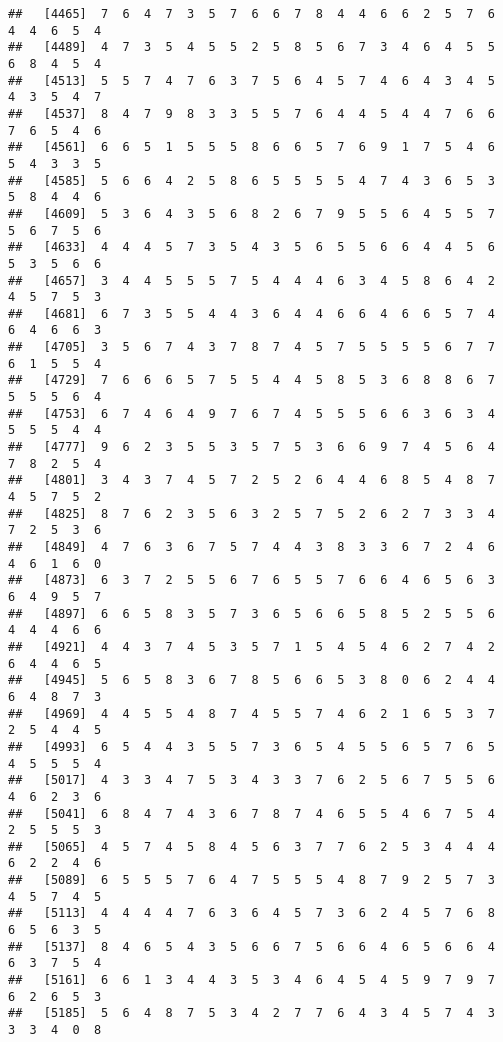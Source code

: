 \documentclass[
]{book}
\begin{document}
\begin{verbatim}
##   [4465]  7  6  4  7  3  5  7  6  6  7  8  4  4  6  6  2  5  7  6  4  4  6  5  4
##   [4489]  4  7  3  5  4  5  5  2  5  8  5  6  7  3  4  6  4  5  5  6  8  4  5  4
##   [4513]  5  5  7  4  7  6  3  7  5  6  4  5  7  4  6  4  3  4  5  4  3  5  4  7
##   [4537]  8  4  7  9  8  3  3  5  5  7  6  4  4  5  4  4  7  6  6  7  6  5  4  6
##   [4561]  6  6  5  1  5  5  5  8  6  6  5  7  6  9  1  7  5  4  6  5  4  3  3  5
##   [4585]  5  6  6  4  2  5  8  6  5  5  5  5  4  7  4  3  6  5  3  5  8  4  4  6
##   [4609]  5  3  6  4  3  5  6  8  2  6  7  9  5  5  6  4  5  5  7  5  6  7  5  6
##   [4633]  4  4  4  5  7  3  5  4  3  5  6  5  5  6  6  4  4  5  6  5  3  5  6  6
##   [4657]  3  4  4  5  5  5  7  5  4  4  4  6  3  4  5  8  6  4  2  4  5  7  5  3
##   [4681]  6  7  3  5  5  4  4  3  6  4  4  6  6  4  6  6  5  7  4  6  4  6  6  3
##   [4705]  3  5  6  7  4  3  7  8  7  4  5  7  5  5  5  5  6  7  7  6  1  5  5  4
##   [4729]  7  6  6  6  5  7  5  5  4  4  5  8  5  3  6  8  8  6  7  5  5  5  6  4
##   [4753]  6  7  4  6  4  9  7  6  7  4  5  5  5  6  6  3  6  3  4  5  5  5  4  4
##   [4777]  9  6  2  3  5  5  3  5  7  5  3  6  6  9  7  4  5  6  4  7  8  2  5  4
##   [4801]  3  4  3  7  4  5  7  2  5  2  6  4  4  6  8  5  4  8  7  4  5  7  5  2
##   [4825]  8  7  6  2  3  5  6  3  2  5  7  5  2  6  2  7  3  3  4  7  2  5  3  6
##   [4849]  4  7  6  3  6  7  5  7  4  4  3  8  3  3  6  7  2  4  6  4  6  1  6  0
##   [4873]  6  3  7  2  5  5  6  7  6  5  5  7  6  6  4  6  5  6  3  6  4  9  5  7
##   [4897]  6  6  5  8  3  5  7  3  6  5  6  6  5  8  5  2  5  5  6  4  4  4  6  6
##   [4921]  4  4  3  7  4  5  3  5  7  1  5  4  5  4  6  2  7  4  2  6  4  4  6  5
##   [4945]  5  6  5  8  3  6  7  8  5  6  6  5  3  8  0  6  2  4  4  6  4  8  7  3
##   [4969]  4  4  5  5  4  8  7  4  5  5  7  4  6  2  1  6  5  3  7  2  5  4  4  5
##   [4993]  6  5  4  4  3  5  5  7  3  6  5  4  5  5  6  5  7  6  5  4  5  5  5  4
##   [5017]  4  3  3  4  7  5  3  4  3  3  7  6  2  5  6  7  5  5  6  4  6  2  3  6
##   [5041]  6  8  4  7  4  3  6  7  8  7  4  6  5  5  4  6  7  5  4  2  5  5  5  3
##   [5065]  4  5  7  4  5  8  4  5  6  3  7  7  6  2  5  3  4  4  4  6  2  2  4  6
##   [5089]  6  5  5  5  7  6  4  7  5  5  5  4  8  7  9  2  5  7  3  4  5  7  4  5
##   [5113]  4  4  4  4  7  6  3  6  4  5  7  3  6  2  4  5  7  6  8  6  5  6  3  5
##   [5137]  8  4  6  5  4  3  5  6  6  7  5  6  6  4  6  5  6  6  4  6  3  7  5  4
##   [5161]  6  6  1  3  4  4  3  5  3  4  6  4  5  4  5  9  7  9  7  6  2  6  5  3
##   [5185]  5  6  4  8  7  5  3  4  2  7  7  6  4  3  4  5  7  4  3  3  3  4  0  8

\end{verbatim}
\end{document}
